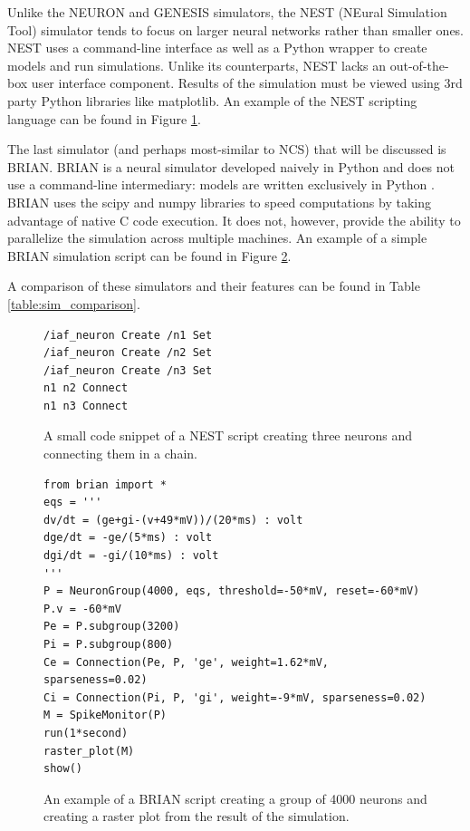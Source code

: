 Unlike the NEURON and GENESIS simulators, the NEST (NEural Simulation Tool)\cite{brette2007simulation} simulator tends to focus on larger neural networks rather than smaller ones. NEST uses a command-line interface as well as a Python wrapper to create models and run simulations.  Unlike its counterparts, NEST lacks an out-of-the-box user interface component. Results of the simulation must be viewed using 3rd party Python libraries like matplotlib\cite{brette2007simulation}. An example of the NEST scripting language can be found in Figure \ref{fig:nest_script_example}\cite{gewaltig2007nest}.

The last simulator (and perhaps most-similar to NCS) that will be discussed is BRIAN. BRIAN is a neural simulator developed naively in Python and does not use a command-line intermediary: models are written exclusively in Python \cite{goodman2013brian}. BRIAN uses the scipy and numpy libraries to speed computations by taking advantage of native C code execution. It does not, however, provide the ability to parallelize the simulation across multiple machines. An example of a simple BRIAN simulation script can be found in Figure \ref{fig:brian_example}\cite{goodman2013brian}.

A comparison of these simulators and their features can be found in Table \ref{table:sim_comparison}\cite{hoang2013novel}.

\begin{figure}
\begin{center}
\begin{lstlisting}
/iaf_neuron Create /n1 Set
/iaf_neuron Create /n2 Set
/iaf_neuron Create /n3 Set
n1 n2 Connect
n1 n3 Connect
\end{lstlisting}
\caption[NEST Script Example \cite{gewaltig2007nest}]{A small code snippet of a NEST script creating three neurons and connecting them in a chain\cite{gewaltig2007nest}.\label{fig:nest_script_example}}
\end{center}
\end{figure}

\begin{figure}
\begin{center}
\begin{lstlisting}
from brian import *
eqs = '''
dv/dt = (ge+gi-(v+49*mV))/(20*ms) : volt
dge/dt = -ge/(5*ms) : volt
dgi/dt = -gi/(10*ms) : volt
'''
P = NeuronGroup(4000, eqs, threshold=-50*mV, reset=-60*mV)
P.v = -60*mV
Pe = P.subgroup(3200)
Pi = P.subgroup(800)
Ce = Connection(Pe, P, 'ge', weight=1.62*mV, sparseness=0.02)
Ci = Connection(Pi, P, 'gi', weight=-9*mV, sparseness=0.02)
M = SpikeMonitor(P)
run(1*second)
raster_plot(M)
show()
\end{lstlisting}
\caption[BRIAN Example \cite{goodman2013brian}]{An example of a BRIAN script creating a group of 4000 neurons and creating a raster plot from the result of the simulation\cite{goodman2013brian}.\label{fig:brian_example}}
\end{center}
\end{figure}

